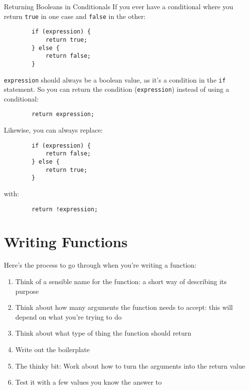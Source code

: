 \pagebreak

\begin{infobox}{Returning Booleans in Conditionals}
    If you ever have a conditional where you return \texttt{true} in one case and \texttt{false} in the other:

    \begin{verbatim}
        if (expression) {
            return true;
        } else {
            return false;
        }
    \end{verbatim}

    \texttt{expression} should always be a boolean value, as it's a condition in the \texttt{if} statement. So you can return the condition (\texttt{expression}) instead of using a conditional:

    \begin{verbatim}
        return expression;
    \end{verbatim}

    Likewise, you can always replace:

    \begin{verbatim}
        if (expression) {
            return false;
        } else {
            return true;
        }
    \end{verbatim}

    with:

    \begin{verbatim}
        return !expression;
    \end{verbatim}

\end{infobox}

\pagebreak

\section{Writing Functions}

Here's the process to go through when you're writing a function:

\begin{enumerate}
    \item Think of a sensible name for the function: a short way of describing its purpose
    \item Think about how many arguments the function needs to accept: this will depend on what you're trying to do
    \item Think about what type of thing the function should return
    \item Write out the boilerplate
    \item The thinky bit: Work about how to turn the arguments into the return value
    \item Test it with a few values you know the answer to
\end{enumerate}


